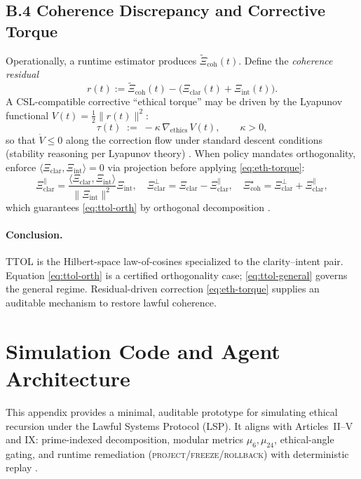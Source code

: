 \documentclass[12pt]{amsart}
\theoremstyle{plain}
\begin{document}
\subsection*{B.4 Coherence Discrepancy and Corrective Torque}
Operationally, a runtime estimator produces $\widetilde{\Xi}_{\mathrm{coh}}(t)$. Define the \emph{coherence residual}
\[
r(t):=\widetilde{\Xi}_{\mathrm{coh}}(t)-\big(\Xi_{\mathrm{clar}}(t)+\Xi_{\mathrm{int}}(t)\big).
\]
A CSL-compatible corrective “ethical torque” may be driven by the Lyapunov functional $V(t)=\tfrac12\|r(t)\|^{2}$:
\begin{equation}
\tau(t)\;:=\;-\kappa\,\nabla_{\!\text{ethics}}\,V(t),\qquad \kappa>0,
\label{eq:eth-torque}
\end{equation}
so that $\dot V\le 0$ along the correction flow under standard descent conditions (stability reasoning per Lyapunov theory) \cite{khalil2002nonlinear}. When policy mandates orthogonality, enforce $\langle \Xi_{\mathrm{clar}},\Xi_{\mathrm{int}}\rangle=0$ via projection before applying \eqref{eq:eth-torque}:
\[
\Xi_{\mathrm{clar}}^{\parallel}=\frac{\langle \Xi_{\mathrm{clar}},\Xi_{\mathrm{int}}\rangle}{\|\Xi_{\mathrm{int}}\|^{2}}\Xi_{\mathrm{int}},
\quad
\Xi_{\mathrm{clar}}^{\perp}=\Xi_{\mathrm{clar}}-\Xi_{\mathrm{clar}}^{\parallel},
\quad
\Xi_{\mathrm{coh}}^{\star}=\Xi_{\mathrm{clar}}^{\perp}+\Xi_{\mathrm{clar}}^{\parallel},
\]
which guarantees \eqref{eq:ttol-orth} by orthogonal decomposition \cite{rudin1991functional,conway1990functional}.

\paragraph{Conclusion.}
TTOL is the Hilbert-space law-of-cosines specialized to the clarity–intent pair. Equation \eqref{eq:ttol-orth} is a certified orthogonality case; \eqref{eq:ttol-general} governs the general regime. Residual-driven correction \eqref{eq:eth-torque} supplies an auditable mechanism to restore lawful coherence.


\clearpage
\section{Simulation Code and Agent Architecture}

\noindent This appendix provides a minimal, auditable prototype for simulating ethical recursion under the Lawful Systems Protocol (LSP). It aligns with Articles~II–V and IX: prime-indexed decomposition, modular metrics $\mu_6,\mu_{24}$, ethical-angle gating, and runtime remediation (\textsc{project}/\textsc{freeze}/\textsc{rollback}) with deterministic replay \cite{schneider2000enforceable,clarke1999model,baier2008model}.
\end{document}

